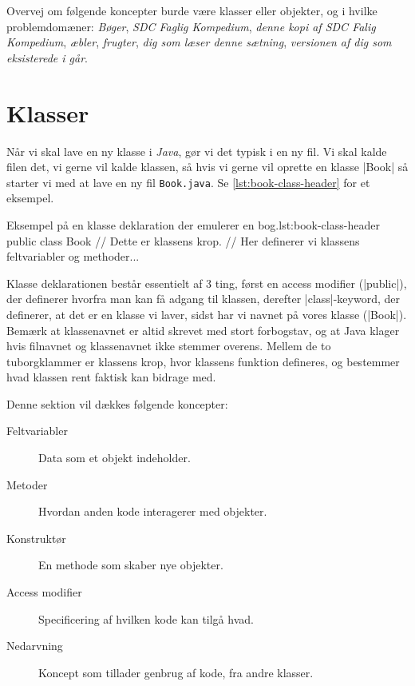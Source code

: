 \begin{exercise}
    Overvej om følgende koncepter burde være klasser eller objekter,
    og i hvilke problemdomæner: \emph{Bøger}, \emph{SDC Faglig
    Kompedium}, \emph{denne kopi af SDC Falig Kompedium},
    \emph{æbler}, \emph{frugter}, \emph{dig som læser denne sætning},
    \emph{versionen af dig som eksisterede i går}.
\end{exercise}

\section{Klasser}

Når vi skal lave en ny klasse i \emph{Java}, gør vi det typisk i en ny fil.
Vi skal kalde filen det, vi gerne vil kalde klassen, så hvis vi gerne
vil oprette en klasse \JavaInline|Book| så starter vi med at lave en
ny fil \verb|Book.java|. Se \autoref{lst:book-class-header} for et eksempel.

\begin{JavaCode}{Eksempel på en klasse deklaration der emulerer en bog.}{lst:book-class-header}
	public class Book {
		// Dette er klassens krop.
        // Her definerer vi klassens feltvariabler og methoder...
	}
\end{JavaCode}

Klasse deklarationen består essentielt af 3 ting, først en access
modifier (\JavaInline|public|), der definerer hvorfra man kan få
adgang til klassen, derefter \JavaInline|class|-keyword, der definerer,
at det er en klasse vi laver, sidst har vi navnet på vores klasse
(\JavaInline|Book|). Bemærk at klassenavnet er altid skrevet med stort
forbogstav, og at Java klager hvis filnavnet og klassenavnet ikke
stemmer overens. Mellem de to tuborgklammer er klassens krop, hvor
klassens funktion defineres, og bestemmer hvad klassen rent faktisk
kan bidrage med.

Denne sektion vil dækkes følgende koncepter:

\begin{description}
\item [Feltvariabler]    Data som et objekt indeholder.
\item [Metoder]          Hvordan anden kode interagerer med objekter.
\item [Konstruktør]      En methode som skaber nye objekter.
\item [Access modifier]  Specificering af hvilken kode kan tilgå hvad.
\item [Nedarvning]       Koncept som tillader genbrug af kode, fra andre klasser.
\end{description}

